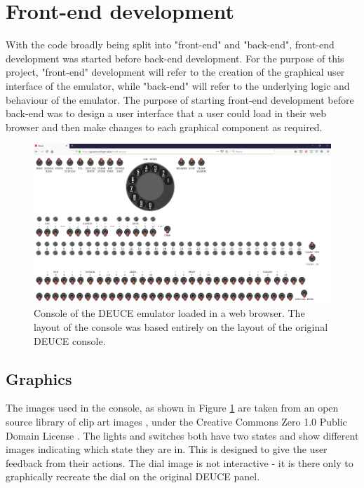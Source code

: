 \documentclass{l4proj}
\begin{document}
\section{Front-end development}
With the code broadly being split into "front-end" and "back-end", front-end development was started before back-end development. For the purpose of this project, "front-end" development will refer to the creation of the graphical user interface of the emulator, while "back-end" will refer to the underlying logic and behaviour of the emulator. The purpose of starting front-end development before back-end was to design a user interface that a user could load in their web browser and then make changes to each graphical component as required. 

\begin{figure}[h]
	\centering
	\includegraphics[width=\linewidth]{images/deuce-emu}
	\caption{Console of the DEUCE emulator loaded in a web browser. The layout of the console was based entirely on the layout of the original DEUCE console.}
	\label{fig:deuce-emu}
\end{figure}

\subsection{Graphics}
The images used in the console, as shown in Figure \ref{fig:deuce-emu} are taken from an open source library of clip art images \citep{openclipart}, under the Creative Commons Zero 1.0 Public Domain License \citep{creativecommons}. The lights and switches both have two states and show different images indicating which state they are in. This is designed to give the user feedback from their actions. The dial image is not interactive - it is there only to graphically recreate the dial on the original DEUCE panel.
\end{document}
